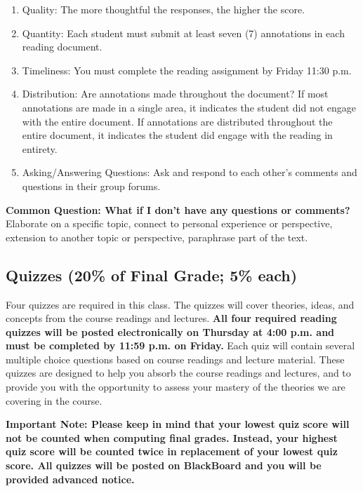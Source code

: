 \documentclass[11pt,]{article}
\providecommand{\tightlist}{%
  \setlength{\itemsep}{0pt}\setlength{\parskip}{0pt}}
\begin{document}
\begin{enumerate}
\def\labelenumi{\arabic{enumi}.}
\tightlist
\item
  Quality: The more thoughtful the responses, the higher the score.
\item
  Quantity: Each student must submit at least seven (7) annotations in
  each reading document.
\item
  Timeliness: You must complete the reading assignment by Friday 11:30
  p.m.
\item
  Distribution: Are annotations made throughout the document? If most
  annotations are made in a single area, it indicates the student did
  not engage with the entire document. If annotations are distributed
  throughout the entire document, it indicates the student did engage
  with the reading in entirety.
\item
  Asking/Answering Questions: Ask and respond to each other's comments
  and questions in their group forums.
\end{enumerate}

\textbf{Common Question: What if I don't have any questions or
comments?} Elaborate on a specific topic, connect to personal experience
or perspective, extension to another topic or perspective, paraphrase
part of the text.

\hypertarget{quizzes}{%
\subsection{Quizzes (20\% of Final Grade; 5\% each)}\label{quizzes}}

Four quizzes are required in this class. The quizzes will cover
theories, ideas, and concepts from the course readings and lectures.
\textbf{All four required reading quizzes will be posted electronically
on Thursday at 4:00 p.m. and must be completed by 11:59 p.m. on Friday.}
Each quiz will contain several multiple choice questions based on course
readings and lecture material. These quizzes are designed to help you
absorb the course readings and lectures, and to provide you with the
opportunity to assess your mastery of the theories we are covering in
the course.

\textbf{Important Note: Please keep in mind that your lowest quiz score
will not be counted when computing final grades. Instead, your highest
quiz score will be counted twice in replacement of your lowest quiz
score. All quizzes will be posted on BlackBoard and you will be provided
advanced notice.}
\end{document}
